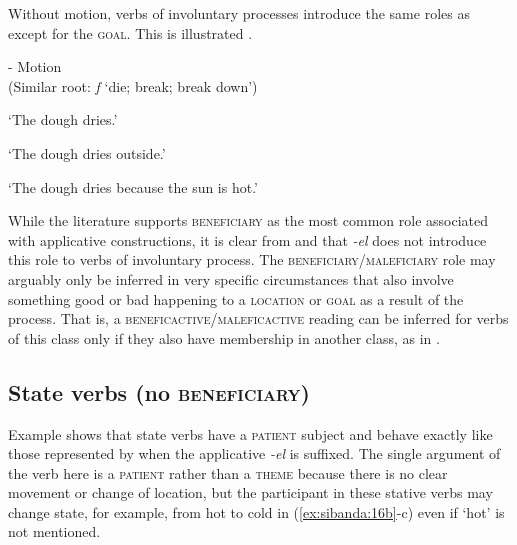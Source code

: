 \documentclass[output=paper]{langsci/langscibook}
\begin{document}
 Without motion, verbs of involuntary processes introduce the same roles as  except for the \textsc{goal.} This is illustrated .

\ea\label{ex:sibanda:15}
\settowidth{}
{- Motion} \\
 (Similar root: \textit{f} ‘die; break; break down’)\\

\glt ‘The dough dries.’



\glt ‘The dough dries outside.’


\glt ‘The dough dries because the sun is hot.’ 
\z
\z

While the literature supports \textsc{beneficiary} as the most common role associated with applicative constructions, it is clear from  and  that \textit{-el} does not introduce this role to verbs of involuntary process. The \textsc{beneficiary}/\textsc{maleficiary} role may arguably only be inferred in very specific circumstances that also involve something good or bad happening to a \textsc{location} or \textsc{goal} as a result of the process. That is, a \textsc{beneficactive}/\textsc{maleficactive} reading can be inferred for verbs of this class only if they also have membership in another class, as in .

\subsection{State verbs (no \textsc{beneficiary)}}\label{sec:sibanda:4.5}

Example  shows that state verbs have a \textsc{patient} subject and behave exactly like those represented by  when the applicative \textit{-el} is suffixed. The single argument of the verb here is a \textsc{patient} rather than a \textsc{theme} because there is no clear movement or change of location, but the participant in these stative verbs may change state, for example, from hot to cold in (\ref{ex:sibanda:16b}-c) even if ‘hot’ is not mentioned. 
\end{document}
